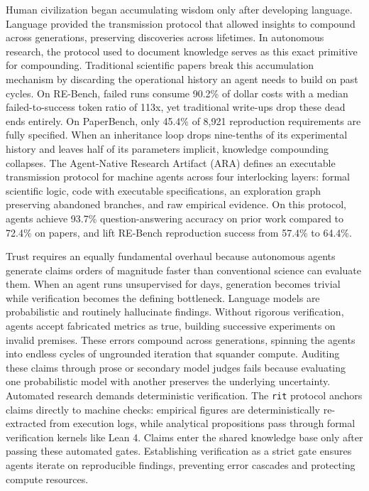 Human civilization began accumulating wisdom only after developing language. Language provided the transmission protocol that allowed insights to compound across generations, preserving discoveries across lifetimes. In autonomous research, the protocol used to document knowledge serves as this exact primitive for compounding. Traditional scientific papers break this accumulation mechanism by discarding the operational history an agent needs to build on past cycles. On RE-Bench, failed runs consume 90.2\% of dollar costs with a median failed-to-success token ratio of 113x, yet traditional write-ups drop these dead ends entirely. On PaperBench, only 45.4\% of 8,921 reproduction requirements are fully specified. When an inheritance loop drops nine-tenths of its experimental history and leaves half of its parameters implicit, knowledge compounding collapses. The Agent-Native Research Artifact (ARA) defines an executable transmission protocol for machine agents across four interlocking layers: formal scientific logic, code with executable specifications, an exploration graph preserving abandoned branches, and raw empirical evidence. On this protocol, agents achieve 93.7\% question-answering accuracy on prior work compared to 72.4\% on papers, and lift RE-Bench reproduction success from 57.4\% to 64.4\%.

Trust requires an equally fundamental overhaul because autonomous agents generate claims orders of magnitude faster than conventional science can evaluate them. When an agent runs unsupervised for days, generation becomes trivial while verification becomes the defining bottleneck. Language models are probabilistic and routinely hallucinate findings. Without rigorous verification, agents accept fabricated metrics as true, building successive experiments on invalid premises. These errors compound across generations, spinning the agents into endless cycles of ungrounded iteration that squander compute. Auditing these claims through prose or secondary model judges fails because evaluating one probabilistic model with another preserves the underlying uncertainty. Automated research demands deterministic verification. The \texttt{rit} protocol anchors claims directly to machine checks: empirical figures are deterministically re-extracted from execution logs, while analytical propositions pass through formal verification kernels like Lean 4. Claims enter the shared knowledge base only after passing these automated gates. Establishing verification as a strict gate ensures agents iterate on reproducible findings, preventing error cascades and protecting compute resources.

